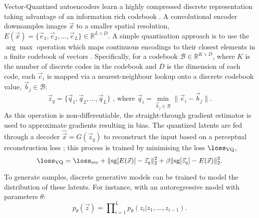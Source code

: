 \noindent Vector-Quantized autoencoders learn a highly compressed discrete representation taking advantage of an information rich codebook \cite{oord2017neural}. A convolutional encoder downsamples images $\vec{x}$ to a smaller spatial resolution, $E(\vec{x}) = \{\vec{e}_1, \vec{e}_2, ..., \vec{e}_L\} \in \mathbb{R}^{L \times D}$. A simple quantisation approach is to use the $\arg\!\max$ operation which maps continuous encodings to their closest elements in a finite codebook of vectors \cite{oord2017neural}. Specifically, for a codebook $\mathcal{B} \in \mathbb{R}^{K \times D}$, where $K$ is the number of discrete codes in the codebook and $D$ is the dimension of each code, each $\vec{e}_i$ is mapped via a nearest-neighbour lookup onto a discrete codebook value, $\vec{b}_j \in \mathcal{B}$:
%
\begin{equation}\label{eqn:quantisation}
    \vec{z}_q = \{\vec{q}_1, \vec{q}_2, ..., \vec{q}_L\} \text{  , where  } \vec{q}_i = \underset{\vec{b}_{j} \in \mathcal{B}}{\operatorname{min}}\|\vec{e}_i - \vec{b}_j\|.
\end{equation}
%
As this operation is non-differentiable, the straight-through gradient estimator \cite{bengio2013estimating} is used to approximate gradients resulting in bias. The quantized latents are fed through a decoder $\hat{\vec{x}}= G(\vec{z}_q)$ to reconstruct the input based on a perceptual reconstruction loss \cite{zhang2018unreasonable, esser2021taming, bond2022unleashing}; this process is trained by minimising the loss $\loss_\text{VQ}$,
%
\begin{equation}\label{eqn:vqvae-loss}
    \loss_\text{VQ} = \loss_\text{rec} + \| \text{sg}[E(\vec{x})] - \vec{z}_q \|_2^2 + \beta \| \text{sg}[\vec{z}_q] - E(\vec{x}) \|_2^2.
\end{equation}

To generate samples, discrete generative models can be trained to model the distribution of these latents. For instance, with an autoregressive model with parameters $\theta$:
%
\begin{equation}
    p_\theta(\vec{z}) = \prod\nolimits_{i=1}^{L}p_\theta(z_i|z_1, ..., z_{i-1}).
\end{equation}
%






